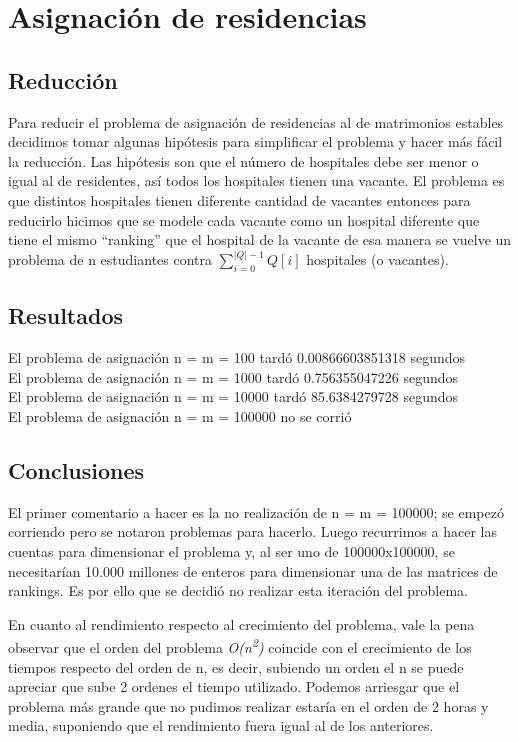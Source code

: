 \documentclass[a4paper,10pt]{article}
\begin{document}
\maketitle
\thispagestyle{empty}

\pagebreak 

\tableofcontents
\pagebreak

\clearpage
\section{Asignación de residencias}

\subsection{Reducción}
	Para reducir el problema de asignación de residencias al de matrimonios estables decidimos tomar algunas hipótesis para simplificar el problema y hacer más fácil la reducción. Las hipótesis son que el número de hospitales debe ser menor o igual al de residentes, así todos los hospitales tienen una vacante. El problema es que distintos hospitales tienen diferente cantidad de vacantes entonces para reducirlo hicimos que se modele cada vacante como un hospital diferente que tiene el mismo “ranking” que el hospital de la vacante de esa manera se vuelve un problema de n estudiantes contra $\sum_{i=0}^{|Q|-1} Q[i]$ hospitales (o vacantes).
    
\subsection{Resultados}
	\noindent El problema de asignación n = m = 100 tardó 0.00866603851318 segundos \\
	El problema de asignación n = m = 1000 tardó 0.756355047226 segundos \\
	El problema de asignación n = m = 10000 tardó 85.6384279728 segundos \\
	El problema de asignación n = m = 100000 no se corrió

\subsection{Conclusiones}
	El primer comentario a hacer es la no realización de n = m = 100000; se empezó corriendo pero se notaron problemas para hacerlo. Luego recurrimos a hacer las cuentas para dimensionar el problema y, al ser uno de 100000x100000, se necesitarían 10.000 millones de enteros para dimensionar una de las matrices de rankings. Es por ello que se decidió no realizar esta iteración del problema.
	\par En cuanto al rendimiento respecto al crecimiento del problema, vale la pena observar que el orden del problema \emph{O(n\textsuperscript{2})} coincide con el crecimiento de los tiempos respecto del orden de n, es decir, subiendo un orden el n se puede apreciar que sube 2 ordenes el tiempo utilizado. Podemos arriesgar que el problema más grande que no pudimos realizar estaría en el orden de 2 horas y media, suponiendo que el rendimiento fuera igual al de los anteriores. 	
\end{document}
